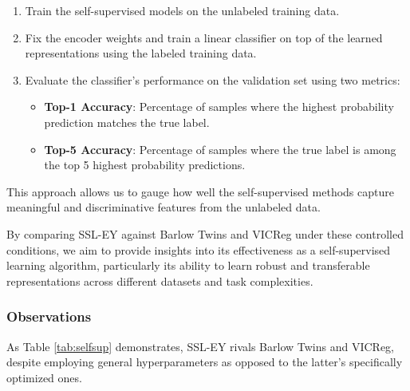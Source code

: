 \begin{enumerate}
    \item Train the self-supervised models on the unlabeled training data.
    \item Fix the encoder weights and train a linear classifier on top of the learned representations using the labeled training data.
    \item Evaluate the classifier's performance on the validation set using two metrics:
        \begin{itemize}
            \item \textbf{Top-1 Accuracy}: Percentage of samples where the highest probability prediction matches the true label.
            \item \textbf{Top-5 Accuracy}: Percentage of samples where the true label is among the top 5 highest probability predictions.
        \end{itemize}
\end{enumerate}

This approach allows us to gauge how well the self-supervised methods capture meaningful and discriminative features from the unlabeled data.

By comparing SSL-EY against Barlow Twins and VICReg under these controlled conditions, we aim to provide insights into its effectiveness as a self-supervised learning algorithm, particularly its ability to learn robust and transferable representations across different datasets and task complexities.

\subsubsection{Observations} As Table \ref{tab:selfsup} demonstrates, SSL-EY rivals Barlow Twins and VICReg, despite employing general hyperparameters as opposed to the latter's specifically optimized ones.

\begin{table}[H]
    \centering
    \caption{Comparing the performance of SSL methods on CIFAR-10 and CIFAR-100.}
    \label{tab:selfsup}
\end{table}

